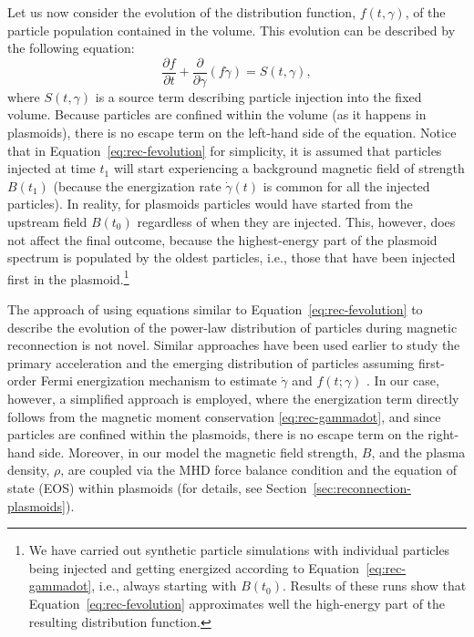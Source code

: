 Let us now consider the evolution of the distribution function, $f(t,\gamma)$, of the particle population contained in the volume. This evolution can be described by the following equation:
\begin{equation}
    \label{eq:rec-fevolution}
    \frac{\partial f}{\partial t} + \frac{\partial}{\partial \gamma}\left(f\dot{\gamma}\right)=S(t,\gamma),
\end{equation}
where $S(t,\gamma)$ is a source term describing particle injection into the fixed volume. Because particles are confined within the volume (as it happens in plasmoids), there is no escape term on the left-hand side of the equation. Notice that in Equation~\eqref{eq:rec-fevolution} for simplicity, it is assumed that particles injected at time $t_1$ will start experiencing a background magnetic field of strength $B(t_1)$ (because the energization rate $\dot{\gamma}(t)$ is common for all the injected particles). In reality, for plasmoids particles would have started from the upstream field $B(t_0)$ regardless of when they are injected. This, however, does not affect the final outcome, because the highest-energy part of the plasmoid spectrum is populated by the oldest particles, i.e., those that have been injected first in the plasmoid.\footnote{We have carried out synthetic particle simulations with individual particles being injected and getting energized according to Equation~\eqref{eq:rec-gammadot}, i.e., always starting with $B(t_0)$. Results of these runs show that Equation~\eqref{eq:rec-fevolution} approximates well the high-energy part of the resulting distribution function.}

The approach of using equations similar to Equation~\eqref{eq:rec-fevolution} to describe the evolution of the power-law distribution of particles during magnetic reconnection is not novel. Similar approaches have been used earlier to study the primary acceleration and the emerging distribution of particles assuming first-order Fermi energization mechanism to estimate $\dot{\gamma}$ and $f(t;\gamma)$ \citep[see, e.g.,][]{2012MNRAS.422.2474D, 2014PhRvL.113o5005G, 2017PhPl...24f2906M, 2019ApJ...879L..23G}. In our case, however, a simplified approach is employed, where the energization term directly follows from the magnetic moment conservation \eqref{eq:rec-gammadot}, and since particles are confined within the plasmoids, there is no escape term on the right-hand side. Moreover, in our model the magnetic field strength, $B$, and the plasma density, $\rho$,  are coupled via the MHD force balance condition and the equation of state (EOS) within plasmoids (for details, see Section~\ref{sec:reconnection-plasmoids}).

